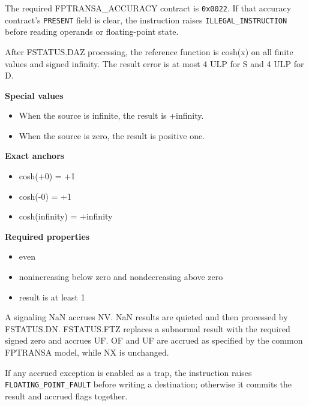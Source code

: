 The required FPTRANSA\_ACCURACY contract is \texttt{0x0022}. If that accuracy contract's \texttt{PRESENT} field is clear, the instruction raises \texttt{ILLEGAL\_INSTRUCTION} before reading operands or floating-point state.

After FSTATUS.DAZ processing, the reference function is cosh(x) on all finite values and signed infinity. The result error is at most 4 ULP for S and 4 ULP for D.

\textbf{Special values}\par
\begin{itemize}
\item When the source is infinite, the result is +infinity.
\item When the source is zero, the result is positive one.
\end{itemize}

\textbf{Exact anchors}\par
\begin{itemize}
\item cosh(+0) = +1
\item cosh(-0) = +1
\item cosh(infinity) = +infinity
\end{itemize}

\textbf{Required properties}\par
\begin{itemize}
\item even
\item nonincreasing below zero and nondecreasing above zero
\item result is at least 1
\end{itemize}

A signaling NaN accrues NV. NaN results are quieted and then processed by FSTATUS.DN. FSTATUS.FTZ replaces a subnormal result with the required signed zero and accrues UF. OF and UF are accrued as specified by the common FPTRANSA model, while NX is unchanged.

If any accrued exception is enabled as a trap, the instruction raises \texttt{FLOATING\_POINT\_FAULT} before writing a destination; otherwise it commits the result and accrued flags together.
